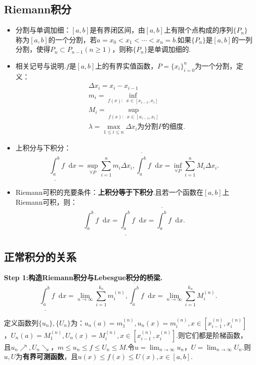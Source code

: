 \documentclass[bwprint, withoutpreface]{cumcmthesis}
\newcommand*{\dif}{\mathop{}\!\mathrm{d}}
\begin{document}
\subsection{Riemann积分}
\begin{itemize}[itemindent=2em]
	\item 分割与单调加细：$[a, b]$是有界闭区间，由$[a, b]$上有限个点构成的序列$\{P_n\}$称为$[a, b]$的一个分割，若$a = x_0 < x_1 < \cdots < x_n = b$.如果$\{P_n\}$是$[a, b]$的一列分割，使得$P_n \subset P_{n - 1} (n \geqslant 1)$，则称$\{P_n\}$是单调加细的.
	\item 相关记号与说明.$f$是$[a, b]$上的有界实值函数，$P = {\{x_i\}}_{i = 0}^{n}$为一个分割，定义：
	\begin{align*}
		& \Delta x_i = x_i - x_{i - 1} \\
		& m_i = \inf_{f(x): \mathop{} \! x \in [x_{i - 1}, x_i]} \\
		& M_i = \sup_{f(x): \mathop{} \! x \in [x_{i - 1}, x_i]} \\
		& \lambda = \max_{1 \leqslant i \leqslant n}{\Delta x_i} \mbox{为分割$P$的细度}.
	\end{align*}
	\item 上积分与下积分：
	\begin{equation*}
		\underline{\int_{a}^{b}} f \dif x = \sup_{\forall P} \sum_{i = 1}^{n}{m_i \Delta x_i}, \overline{\int_{a}^{b}} f \dif x = \inf_{\forall P} \sum_{i = 1}^{n}{M_i \Delta x_i}.
	\end{equation*}
	\item Riemann可积的充要条件：\textbf{上积分等于下积分}.且若一个函数在$[a, b]$上Riemann可积，则：
	\begin{equation*}
		\int_{a}^{b} f \dif x = \underline{\int_{a}^{b}} f \dif x = \overline{\int_{a}^{b}} f \dif x.
	\end{equation*}
\end{itemize}

\subsection{正常积分的关系}
\textbf{Step 1:构造Riemann积分与Lebesgue积分的桥梁.}
\begin{equation*}
	\underline{\int_{a}^{b}} f \dif x = \lim_{n \to \infty}{\sum_{i = 1}^{k_n}{m_i^{(n)}}}, \overline{\int_{a}^{b}} f \dif x = \lim_{n \to \infty}{\sum_{i = 1}^{k_n}{M_i^{(n)}}}.
\end{equation*}

定义函数列$\{u_n\}, \{U_n\}$为：$u_n(a) = m_1^{(n)}, u_n(x) = m_i^{(n)}, x \in [x_{i - 1}^{(n)}, x_i^{(n)}]$，$U_n(a) = M_1^{(n)}, U_n(x) = M_i^{(n)}, x \in [x_{i - 1}^{(n)}, x_i^{(n)}]$.则它们都是阶梯函数，且$u_n \nearrow, U_n \searrow$，$m \leqslant u_n \leqslant f \leqslant U_n \leqslant M$.令$u = \lim_{n \to \infty}{u_n}$，$U = \lim_{n \to \infty}{U_n}$.则$u, U$为\textbf{有界可测函数}，且$u(x) \leqslant f(x) \leqslant U(x), x \in [a, b]$.
\end{document}
